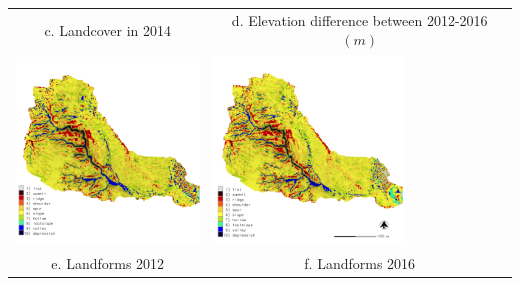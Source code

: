 \documentclass{standalone}
\begin{document}
\begin{tabular}{m{} m{}}
\multicolumn{1}{c}{c. Landcover in 2014} & \multicolumn{1}{c}{d. Elevation difference between 2012-2016 $(m)$}\\
%
\includegraphics[height=50mm,center]{../../images/sample_data/landforms_2012.png} &
\includegraphics[height=50mm,center]{../../images/sample_data/landforms_2016_carto.png}\\
\multicolumn{1}{c}{e. Landforms 2012} & \multicolumn{1}{c}{f. Landforms 2016}\\
%
\end{tabular}
\end{document}
